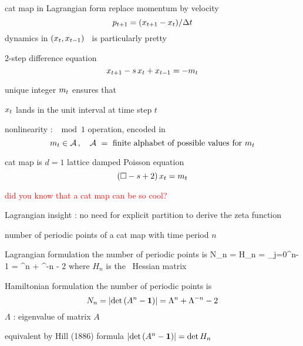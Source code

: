 \begin{frame}{cat map in Lagrangian form}
replace momentum by velocity
\[
p_{t+1}=(x_{t+1}  - x_{t})/\Delta t
\]
dynamics in $(x_{t},x_{t-1})$  \statesp\
is particularly pretty
\begin{block}{2-step difference equation}
\[
x_{t+1}  -  s \, x_{t} + x_{t-1}
    =
-{m_{t}}
\] %
\end{block}
unique integer ${m_{t}}$
ensures that

\hfill $x_{t}$ lands in the unit interval at time step $t$

\bigskip
nonlinearity : $ \mod 1$ operation, encoded in
\[
{m_{t}}\in  \mathcal{A}
\,,\quad \mathcal{A}\ = \mbox{ finite alphabet of possible values for } {\ensuremath{m_{t}}}
\]
\end{frame}

\begin{frame}{cat map is $d=1$ lattice damped Poisson equation}
\[
 (\Box -s+2)\,x_{t} = m_t
\] %

\vfill

\hfill
\textcolor{red}{did you know that a cat map can be so cool?}
\end{frame}

\begin{frame}{Lagrangian insight : }
no need for explicit partition to derive the zeta function
\end{frame}

\begin{frame}{number of periodic points of a cat map with time period $n$ }
\begin{block}{Lagrangian formulation}
the number of periodic points is
\bea
N_n = \det H_n
 = \prod_{j=0}^{n-1}
             \left[s - 2 \cos\left(\frac{2 \pi j}{n}\right)\right]
= \Lambda^n + \Lambda^{-n} - 2
\eea
where  $H_n$ is the \po\ Hessian matrix
\end{block}
\begin{block}{Hamiltonian formulation}
the number of periodic points  is
\[
N_n = |\mathrm{det}\,(A^n - {\bf 1})|
            = \Lambda^n + \Lambda^{-n} - 2
\]
$\Lambda$ : eigenvalue of matrix $A$
\end{block}
\vfill\hfill
equivalent by Hill (1886) formula \quad
\(
|\mathrm{det}\,(A^n - {\bf 1})| = \mathrm{det}\, H_n
\)
\end{frame}

